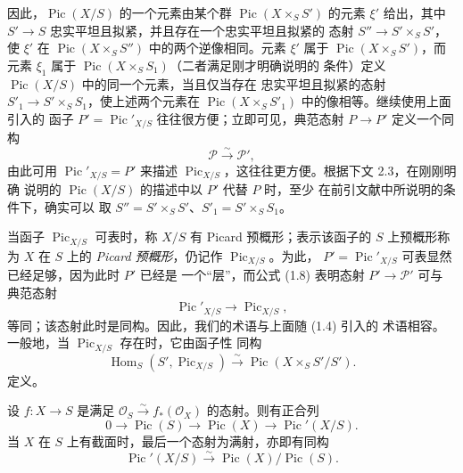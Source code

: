 因此，$\operatorname{Pic}(X/S)$ 的一个元素由某个群
$\operatorname{Pic}(X\times_SS')$ 的元素 $\xi'$ 给出，其中
$S'\longrightarrow S$ 忠实平坦且拟紧，并且存在一个忠实平坦且拟紧的
态射 $S''\longrightarrow S'\times_SS'$，使 $\xi'$ 在
$\operatorname{Pic}(X\times_SS'')$ 中的两个逆像相同。元素 $\xi'$ 属于 $\operatorname{Pic}(X\times_SS')$，而元素
$\xi_1$ 属于 $\operatorname{Pic}(X\times_SS_1)$（二者满足刚才明确说明的
条件）定义 $\operatorname{Pic}(X/S)$ 中的同一个元素，当且仅当存在
忠实平坦且拟紧的态射
$S'_1\longrightarrow S'\times_SS_1$，使上述两个元素在
$\operatorname{Pic}(X\times_SS'_1)$ 中的像相等。继续使用上面引入的
函子 $P'=\operatorname{Pic}'_{X/S}$ 往往很方便；立即可见，典范态射
$P\longrightarrow P'$ 定义一个同构
\begin{equation}
\mathcal P\xrightarrow{\sim}\mathcal P',
\tag{1.8}
\end{equation}
由此可用 $\operatorname{Pic}'_{X/S}=P'$ 来描述
$\operatorname{Pic}_{X/S}$，这往往更方便。根据下文 2.3，在刚刚明确
说明的 $\operatorname{Pic}(X/S)$ 的描述中以 $P'$ 代替 $P$ 时，至少
在前引文献中所说明的条件下，确实可以
取 $S''=S'\times_SS'$、$S'_1=S'\times_SS_1$。

当函子 $\operatorname{Pic}_{X/S}$ 可表时，称 $X/S$ 有 Picard
预概形；表示该函子的 $S$ 上预概形称为 $X$ 在 $S$ 上的
\emph{Picard 预概形}，仍记作 $\operatorname{Pic}_{X/S}$。为此，
$P'=\operatorname{Pic}'_{X/S}$ 可表显然已经足够，因为此时 $P'$ 已经是
一个“层”，而公式 (1.8) 表明态射 $P'\longrightarrow\mathcal P'$ 可与
典范态射
\begin{equation}
\operatorname{Pic}'_{X/S}\longrightarrow\operatorname{Pic}_{X/S},
\tag{1.9}
\end{equation}
等同；该态射此时是同构。因此，我们的术语与上面随 (1.4) 引入的
术语相容。一般地，当 $\operatorname{Pic}_{X/S}$ 存在时，它由函子性
同构
\begin{equation}
\operatorname{Hom}_S(S',\operatorname{Pic}_{X/S})\xrightarrow{\sim}
\operatorname{Pic}(X\times_SS'/S').
\tag{1.10}
\end{equation}
定义。


 设 $f:X\longrightarrow S$ 是满足
$\mathcal O_S\xrightarrow{\sim}f_*(\mathcal O_X)$ 的态射。则有正合列
\[
0\longrightarrow\operatorname{Pic}(S)\longrightarrow\operatorname{Pic}(X)
\longrightarrow\operatorname{Pic}'(X/S).
\]
当 $X$ 在 $S$ 上有截面时，最后一个态射为满射，亦即有同构
\[
\operatorname{Pic}'(X/S)\xrightarrow{\sim}
\operatorname{Pic}(X)/\operatorname{Pic}(S).
\]


